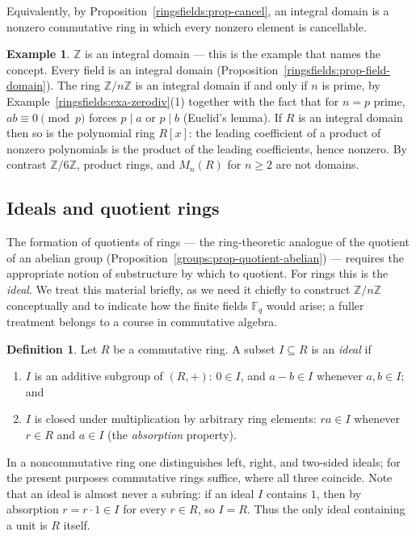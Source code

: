\documentclass[11pt,a4paper]{article}
\theoremstyle{definition}
\newtheorem{definition}[theorem]{Definition}
\newtheorem{example}[theorem]{Example}
\theoremstyle{remark}
\newcommand{\Z}{\ensuremath{\mathbb{Z}}}
\newcommand{\Fq}{\ensuremath{\mathbb{F}_{q}}}
\begin{document}
Equivalently, by Proposition~\ref{ringsfields:prop-cancel}, an integral domain is a nonzero commutative ring in which every nonzero element is cancellable.

\begin{example}\label{ringsfields:exa-domain}
\(\Z\) is an integral domain --- this is the example that names the concept. Every field is an integral domain (Proposition~\ref{ringsfields:prop-field-domain}). The ring \(\Z/n\Z\) is an integral domain if and only if \(n\) is prime, by Example~\ref{ringsfields:exa-zerodiv}(1) together with the fact that for \(n=p\) prime, \(ab\equiv 0\pmod p\) forces \(p\mid a\) or \(p\mid b\) (Euclid's lemma). If \(R\) is an integral domain then so is the polynomial ring \(R[x]\): the leading coefficient of a product of nonzero polynomials is the product of the leading coefficients, hence nonzero. By contrast \(\Z/6\Z\), product rings, and \(M_n(R)\) for \(n\geq 2\) are not domains.
\end{example}

\subsection{Ideals and quotient rings}\label{ringsfields:subsec-ideals}

The formation of quotients of rings --- the ring-theoretic analogue of the quotient of an abelian group (Proposition~\ref{groups:prop-quotient-abelian}) --- requires the appropriate notion of substructure by which to quotient. For rings this is the \emph{ideal}. We treat this material briefly, as we need it chiefly to construct \(\Z/n\Z\) conceptually and to indicate how the finite fields \(\Fq\) would arise; a fuller treatment belongs to a course in commutative algebra.

\begin{definition}\label{ringsfields:def-ideal}
Let \(R\) be a commutative ring. A subset \(I\subseteq R\) is an \emph{ideal} if
\begin{enumerate}
\item \(I\) is an additive subgroup of \((R,+)\): \(0\in I\), and \(a-b\in I\) whenever \(a,b\in I\); and
\item \(I\) is closed under multiplication by arbitrary ring elements: \(ra\in I\) whenever \(r\in R\) and \(a\in I\) (the \emph{absorption} property).
\end{enumerate}
\end{definition}

In a noncommutative ring one distinguishes left, right, and two-sided ideals; for the present purposes commutative rings suffice, where all three coincide. Note that an ideal is almost never a subring: if an ideal \(I\) contains \(1\), then by absorption \(r = r\cdot 1\in I\) for every \(r\in R\), so \(I=R\). Thus the only ideal containing a unit is \(R\) itself.
\end{document}
